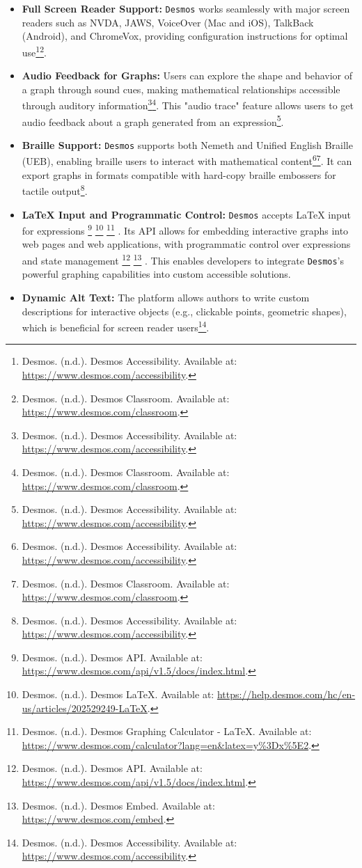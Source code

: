 \begin{itemize}
    \item \textbf{Full Screen Reader Support:} \texttt{Desmos} works seamlessly with major screen readers such as NVDA, JAWS, VoiceOver (Mac and iOS), TalkBack (Android), and ChromeVox, providing configuration instructions for optimal use\footnote{Desmos. (n.d.). Desmos Accessibility. Available at: \url{https://www.desmos.com/accessibility}.}\footnote{Desmos. (n.d.). Desmos Classroom. Available at: \url{https://www.desmos.com/classroom}.}.
    \item \textbf{Audio Feedback for Graphs:} Users can explore the shape and behavior of a graph through sound cues, making mathematical relationships accessible through auditory information\footnote{Desmos. (n.d.). Desmos Accessibility. Available at: \url{https://www.desmos.com/accessibility}.}\footnote{Desmos. (n.d.). Desmos Classroom. Available at: \url{https://www.desmos.com/classroom}.}. This "audio trace" feature allows users to get audio feedback about a graph generated from an expression\footnote{Desmos. (n.d.). Desmos Accessibility. Available at: \url{https://www.desmos.com/accessibility}.}.
    \item \textbf{Braille Support:} \texttt{Desmos} supports both Nemeth and Unified English Braille (UEB), enabling braille users to interact with mathematical content\footnote{Desmos. (n.d.). Desmos Accessibility. Available at: \url{https://www.desmos.com/accessibility}.}\footnote{Desmos. (n.d.). Desmos Classroom. Available at: \url{https://www.desmos.com/classroom}.}. It can export graphs in formats compatible with hard-copy braille embossers for tactile output\footnote{Desmos. (n.d.). Desmos Accessibility. Available at: \url{https://www.desmos.com/accessibility}.}.
    \item \textbf{LaTeX Input and Programmatic Control:} \texttt{Desmos} accepts LaTeX input for expressions
        \footnote{Desmos. (n.d.). Desmos API. Available at: \url{https://www.desmos.com/api/v1.5/docs/index.html}.}
        \footnote{Desmos. (n.d.). Desmos LaTeX. Available at: \url{https://help.desmos.com/hc/en-us/articles/202529249-LaTeX}.}
        \footnote{Desmos. (n.d.). Desmos Graphing Calculator - LaTeX. Available at: \url{https://www.desmos.com/calculator?lang=en\&latex=y\%3Dx\%5E2}.}
        . Its API allows for embedding interactive graphs into web pages and web applications, with programmatic control over expressions and state management
        \footnote{Desmos. (n.d.). Desmos API. Available at: \url{https://www.desmos.com/api/v1.5/docs/index.html}.}
        \footnote{Desmos. (n.d.). Desmos Embed. Available at: \url{https://www.desmos.com/embed}.}
        . This enables developers to integrate \texttt{Desmos}'s powerful graphing capabilities into custom accessible solutions.
    \item \textbf{Dynamic Alt Text:} The platform allows authors to write custom descriptions for interactive objects (e.g., clickable points, geometric shapes), which is beneficial for screen reader users\footnote{Desmos. (n.d.). Desmos Accessibility. Available at: \url{https://www.desmos.com/accessibility}.}.
\end{itemize}

